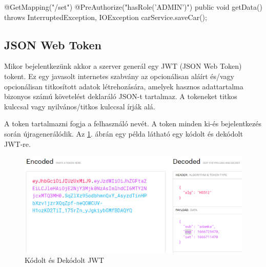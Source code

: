 \begin{java}
@GetMapping("/set")
@PreAuthorize("hasRole('ADMIN')")
public void getData() throws InterruptedException,
IOException {
   carService.saveCar();
}
\end{java}
\newpage

\subsection{JSON Web Token}
Mikor bejelentkezünk akkor a szerver generál egy JWT (JSON Web Token)\cite{JWT} tokent. Ez egy javasolt internetes szabvány az opcionálisan aláírt és/vagy opcionálisan titkosított adatok létrehozására, amelyek hasznos adattartalma bizonyos számú követelést deklaráló JSON-t tartalmaz. A tokeneket titkos kulccsal vagy nyilvános/titkos kulccsal írják alá.

A token tartalmazni fogja a felhasználó nevét. A token minden ki-és bejelentkezés során újragenerálódik. 
Az \ref{fig:JWT}. ábrán egy példa látható egy kódolt és dekódolt JWT-re.

\begin{figure}[h]
\centering
\includegraphics[scale=0.6]{images/jwt.io.png}
\caption{Kódolt és Dekódolt JWT \cite{JWTexample}}
\label{fig:JWT}
\end{figure}